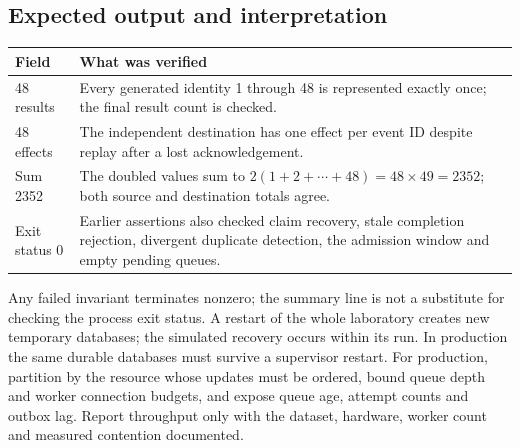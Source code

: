 \subsection{Expected output and interpretation}
\begin{longtable}{L{.30\linewidth}L{.62\linewidth}}
\toprule Field & What was verified\\ \midrule{} results & Every generated identity 1 through 48 is represented exactly once; the final result count is checked.\\
48 effects & The independent destination has one effect per event ID despite replay after a lost acknowledgement.\\
Sum 2352 & The doubled values sum to $2(1+2+\cdots+48)=48\times49=2352$; both source and destination totals agree.\\
Exit status 0 & Earlier assertions also checked claim recovery, stale completion rejection, divergent duplicate detection, the admission window and empty pending queues.\\
\bottomrule\end{longtable}
Any failed invariant terminates nonzero; the summary line is not a
substitute for checking the process exit status. A restart of the whole
laboratory creates new temporary databases; the simulated recovery occurs
within its run. In production the same durable databases must survive a
supervisor restart.
For production, partition by the resource whose updates must be ordered,
bound queue depth and worker connection budgets, and expose queue age,
attempt counts and outbox lag. Report throughput only with the dataset,
hardware, worker count and measured contention documented.
